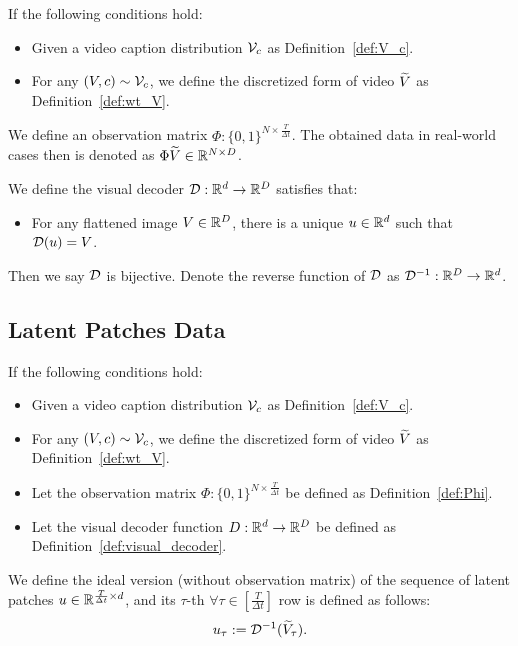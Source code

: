 \begin{definition}\label{def:Phi}
    If the following conditions hold:
    \begin{itemize}
        \item Given a video caption distribution ${\cal V}_c$ as Definition~\ref{def:V_c}.
        \item For any $(V, c) \sim {\cal V}_c$, we define the discretized form of video $\widetilde{V}$ as Definition~\ref{def:wt_V}.
    \end{itemize}
    We define an observation matrix $\Phi: \{0, 1\}^{N \times \frac{T}{\Delta t}}$. The obtained data in real-world cases then is denoted as $\Phi \widetilde{V} \in \mathbb{R}^{N \times D}$.
\end{definition}

\begin{definition}\label{def:visual_decoder}
    We define the visual decoder ${\cal D}: \mathbb{R}^d \rightarrow \mathbb{R}^D$ satisfies that:
    \begin{itemize}
        \item For any flattened image $V \in \mathbb{R}^D$, there is a unique $u \in \mathbb{R}^d$ such that ${\cal D}(u) = V$.
    \end{itemize}
    Then we say ${\cal D}$ is bijective. Denote the reverse function of ${\cal D}$ as ${\cal D}^{-1}: \mathbb{R}^D \rightarrow \mathbb{R}^d$.
\end{definition}

\subsection{Latent Patches Data} \label{sub:app:latent_patches}

\begin{definition}\label{def:u}
    If the following conditions hold:
    \begin{itemize}
        \item Given a video caption distribution ${\cal V}_c$ as Definition~\ref{def:V_c}.
        \item For any $(V, c) \sim {\cal V}_c$, we define the discretized form of video $\widetilde{V}$ as Definition~\ref{def:wt_V}.
        \item Let the observation matrix $\Phi: \{0, 1\}^{N \times \frac{T}{\Delta t}}$ be defined as Definition~\ref{def:Phi}.
        \item Let the visual decoder function $D: \mathbb{R}^d \rightarrow \mathbb{R}^D$ be defined as Definition~\ref{def:visual_decoder}.
    \end{itemize}
    We define the ideal version (without observation matrix) of the sequence of latent patches $u \in \mathbb{R}^{\frac{T}{\Delta t} \times d}$, and its $\tau$-th $ \forall \tau \in [\frac{T}{\Delta t}]$ row is defined as follows:
    \begin{align*}
        u_\tau := {\cal D}^{-1}( \widetilde{V}_\tau ).
    \end{align*}
\end{definition}

